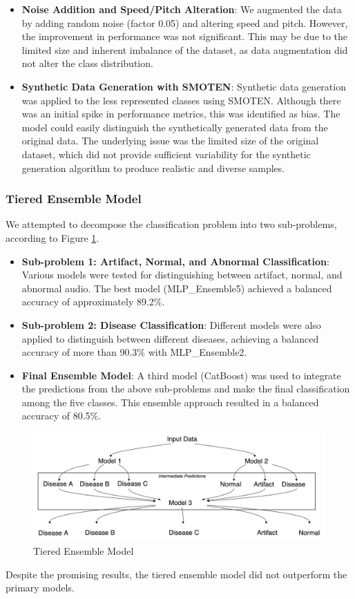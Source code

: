 \begin{itemize}[leftmargin=*]
    \item \textbf{Noise Addition and Speed/Pitch Alteration}: We augmented the data by adding random noise (factor 0.05)
    and altering speed and pitch. However, the improvement in performance was not significant. 
    This may be due to the limited size and inherent imbalance of the dataset, as data augmentation 
    did not alter the class distribution.
    \item \textbf{Synthetic Data Generation with SMOTEN}: Synthetic data generation was applied to the 
    less represented classes using SMOTEN. Although there was an initial spike in performance metrics, 
    this was identified as bias. The model could easily distinguish the synthetically generated data from 
    the original data. The underlying issue was the limited size of the original dataset, which did not 
    provide sufficient variability for the synthetic generation algorithm to produce realistic 
    and diverse samples.
\end{itemize}

\subsubsection*{Tiered Ensemble Model}

We attempted to decompose the classification problem into two sub-problems, according to Figure \ref{fig:tiered_ensemble}.

\begin{itemize}[leftmargin=*]
    \item \textbf{Sub-problem 1: Artifact, Normal, and Abnormal Classification}: Various models were 
    tested for distinguishing between artifact, normal, and abnormal audio. The best model 
    (MLP\_Ensemble5) achieved a balanced accuracy of approximately 89.2\%.
    \item \textbf{Sub-problem 2: Disease Classification}: Different models were also applied to 
    distinguish between different diseases, achieving a balanced accuracy of more than 90.3\% with MLP\_Ensemble2.
    \item \textbf{Final Ensemble Model}: A third model (CatBoost) was used to integrate the predictions 
    from the above sub-problems and make the final classification among the five classes. This ensemble 
    approach resulted in a balanced accuracy of 80.5\%.
\end{itemize}

\begin{figure}[H]
    \centering
    \includegraphics[width=1\columnwidth]{images/tiered_ensemble.png}
    \caption{Tiered Ensemble Model}
    \label{fig:tiered_ensemble}
\end{figure}

\noindent
Despite the promising results, the tiered ensemble model did not outperform the primary models.
